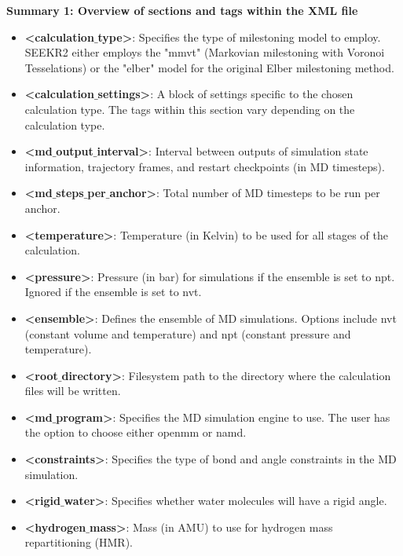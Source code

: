 \documentclass[9pt,training,pubversion]{livecoms}
\begin{document}
\begin{mdframed}[backgroundcolor=black!8!white, linewidth=0.5pt, leftmargin=0pt, rightmargin=10pt, innertopmargin=2pt, innerbottommargin=2pt]
\textbf{Summary 1: Overview of sections and tags within the XML file}

\vspace{2mm}
\begin{itemize}[nosep] 
\item \textbf{<calculation$\_$type>}: Specifies the type of milestoning model to employ. SEEKR2 either employs the "mmvt" (Markovian milestoning with Voronoi Tesselations) or the "elber" model for the original Elber milestoning method.
\item \textbf{<calculation$\_$settings>}: A block of settings specific to the chosen calculation type. The tags within this section vary depending on the calculation type.
\item \textbf{<md$\_$output$\_$interval>}: Interval between outputs of simulation state information, trajectory frames, and restart checkpoints (in MD timesteps).
\item \textbf{<md$\_$steps$\_$per$\_$anchor>}: Total number of MD timesteps to be run per anchor.
\item \textbf{<temperature>}: Temperature (in Kelvin) to be used for all stages of the calculation.
\item \textbf{<pressure>}: Pressure (in bar) for simulations if the ensemble is set to npt. Ignored if the ensemble is set to nvt.
\item \textbf{<ensemble>}: Defines the ensemble of MD simulations. Options include nvt (constant volume and temperature) and npt (constant pressure and temperature).
\item \textbf{<root$\_$directory>}: Filesystem path to the directory where the calculation files will be written.
\item \textbf{<md$\_$program>}: Specifies the MD simulation engine to use. The user has the option to choose either openmm or namd.
\item \textbf{<constraints>}: Specifies the type of bond and angle constraints in the MD simulation.
\item \textbf{<rigid$\_$water>}: Specifies whether water molecules will have a rigid angle.
\item\textbf{ <hydrogen$\_$mass>}: Mass (in AMU) to use for hydrogen mass repartitioning (HMR).

\end{itemize}
\end{mdframed}
\end{document}
